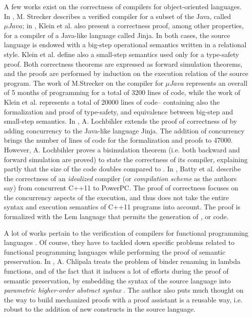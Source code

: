 \documentclass[pdflatex,sn-mathphys]{sn-jnl}%
\theoremstyle{thmstyleone}%
\theoremstyle{thmstyletwo}%
\theoremstyle{thmstylethree}%
\begin{document}
A few works exist on the correctness of compilers for object-oriented
languages. In \cite{Strecker2002}, M. Strecker describes a verified
compiler for a subset of the Java, called $\mu{}Java$; in
\cite{Klein2006}, Klein et al. also present a correctness proof, among
other properties, for a compiler of a Java-like language called Jinja.
In both cases, the source language is endowed with a big-step
operational semantics written in a relational style. Klein et
al. define also a small-step semantics used only for a type-safety
proof. Both correctness theorems are expressed as forward simulation
theorems, and the proofs are performed by induction on the execution
relation of the source program. The work of M.Strecker on the compiler
for $\mu{}Java$ represents an overall of 5 months of programming for a
total of 3200 lines of \isahol{} code, while the work of Klein et
al. represents a total of 20000 lines of \isahol{} code-- containing
also the formalization and proof of type-safety, and equivalence
between big-step and small-step semantics. In \cite{Lochbihler2010},
A. Lochbihler extends the proof of correctness of \cite{Klein2006} by
adding concurrency to the Java-like language Jinja. The addition of
concurrency brings the number of lines of \isahol{} code for the
formalization and proofs to 47000. However, A. Lochbihler proves a
bisimulation theorem (i.e. both backward and forward simulation are
proved) to state the correctness of its compiler, explaining partly
that the size of the code doubles compared to \cite{Klein2006}. In
\cite{Batty2012}, Batty et al. describe the correctness of an
\textit{idealized} compiler (or \textit{compilation scheme} as the
authors say) from concurrent C++11 to PowerPC. The proof of
correctness focuses on the concurrency aspects of the execution, and
thus does not take the entire syntax and execution semantics of C++11
programs into account. The proof is formalized with the \textsf{Lem}
language that permits the generation of \isahol{}, \coq{} or \ocaml{}
code.

A lot of works pertain to the verification of compilers for functional
programming languages \cite{Benton2009, Chlipala2010, Tan2016}. Of
course, they have to tackled down specific problems related to
functional programming languages while performing the proof of
semantic preservation. In \cite{Chlipala2010}, A. Chlipala treats the
problem of binder renaming in lambda functions, and of the fact that
it induces a lot of efforts during the proof of semantic preservation,
by embedding the syntax of the source language into \textit{parametric
  higher-order abstract syntax} \cite{Chlipala2008}. The author also
puts much thought on the way to build mechanized proofs with a proof
assistant is a reusable way, i.e. robust to the addition of new
constructs in the source language.
\end{document}
